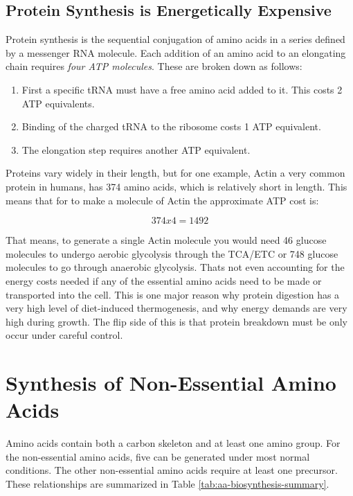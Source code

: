 \documentclass{tufte-handout}
\begin{document}
\subsection{Protein Synthesis is Energetically Expensive}

Protein synthesis is the sequential conjugation of amino acids in a series defined by a messenger RNA molecule.  Each addition of an amino acid to an elongating chain requires \emph{four ATP molecules}.  These are broken down as follows:

\begin{enumerate}
\item First a specific tRNA must have a free amino acid added to it.  This costs 2 ATP equivalents.
\item Binding of the charged tRNA to the ribosome costs 1 ATP equivalent.
\item The elongation step requires another ATP equivalent.
\end{enumerate}

Proteins vary widely in their length, but for one example, Actin a very common protein in humans, has 374 amino acids, which is relatively short in length.  This means that for to make a molecule of Actin the approximate ATP cost is:

\begin{equation}
374 x 4 = 1492 
\end{equation}

That means, to generate a single Actin molecule you would need 46 glucose molecules to undergo aerobic glycolysis through the TCA/ETC or 748 glucose molecules to go through anaerobic glycolysis. Thats not even accounting for the energy costs needed if any of the essential amino acids need to be made or transported into the cell.  This is one major reason why protein digestion has a very high level of diet-induced thermogenesis, and why energy demands are very high during growth.  The flip side of this is that protein breakdown  must be only occur under careful control.

\section{Synthesis of Non-Essential Amino Acids}

Amino acids contain both a carbon skeleton and at least one amino group.  For the non-essential amino acids, five can be generated under most normal conditions.  The other non-essential amino acids require at least one precursor.  These relationships are summarized in Table \ref{tab:aa-biosynthesis-summary}.
\end{document}
